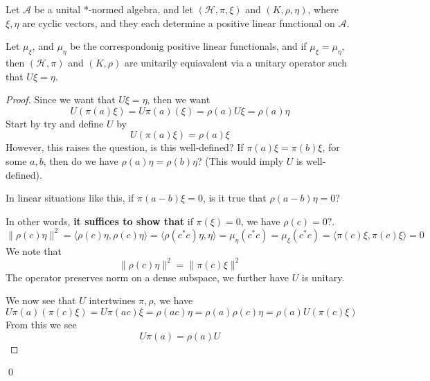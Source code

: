 \begin{proposition}
    Let $\mathcal{A}$ be a unital *-normed algebra, and let $(\mathcal{H}, \pi, \xi)$ and $(K, \rho, \eta)$, where $\xi, \eta$ are cyclic vectors, and they each determine a positive linear functional on $\mathcal{A}$. 

    Let $\mu_\xi$, and $\mu_\eta$ be the correspondonig positive linear functionals, and if $\mu_\xi=\mu_\eta$, then $(\mathcal{H}, \pi)$ and $(K, \rho)$ are unitarily equiavalent via a unitary operator such that $U\xi=\eta$.
\end{proposition}
\begin{comment}
    If your representation is non-irreducible, then every nonzero vector is a cyclic vector.
\end{comment}
\begin{proof}
    Since we want that $U\xi=\eta$, then we want 
    \begin{equation*}
        U(\pi(a)\xi)=U\pi(a)(\xi)=\rho(a)U\xi=\rho(a)\eta
    \end{equation*}
    Start by try and define $U$ by 
    \begin{equation*}
        U(\pi(a)\xi)=\rho(a)\xi
    \end{equation*}
    However, this raises the question, is this well-defined? If $\pi(a)\xi=\pi(b)\xi$, for some $a,b$, then do we have $\rho(a)\eta=\rho(b)\eta$? (This would imply $U$ is well-defined).

    \begin{remark}
        In linear situations like this, if $\pi(a-b)\xi=0$, is it true that $\rho(a-b)\eta=0$?
    \end{remark}
    In other words, \textbf{it suffices to show that } if $\pi(\xi)=0$,  we have $\rho(c)=0?$.
    \begin{equation*}
        \|\rho(c)\eta\|^2=\langle \rho(c)\eta, \rho(c)\eta\rangle=\langle \rho(c^*c)\eta, \eta\rangle=\mu_\eta(c^*c)=\mu_\xi(c^*c)=\langle \pi(c)\xi, \pi(c)\xi\rangle =0
    \end{equation*}
    We note that
    \begin{equation*}
        \|\rho(c)\eta\|^2=\|\pi(c)\xi\|^2
    \end{equation*}
    The operator preserves norm on a dense subspace, we further have $U$ is unitary.

    We now see that $U$ intertwines $\pi, \rho$, we have
    \begin{equation*}
        U\pi(a)(\pi(c)\xi)=U\pi(ac)\xi=\rho(ac)\eta=\rho(a)\rho(c)\eta=\rho(a)U(\pi(c)\xi)
    \end{equation*}
    From this we see
    \begin{equation*}
        U\pi(a)=\rho(a)U
    \end{equation*}
\end{proof}
\qed

